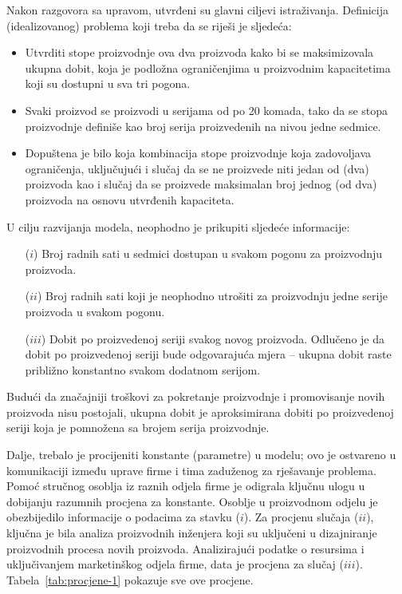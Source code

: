 \documentclass[a4paper, utf8, 11pt, colorlinks]{book}
\theoremstyle{definition}
\begin{document}
Nakon razgovora sa upravom, utvrđeni su glavni ciljevi istraživanja. Definicija  (idealizovanog) problema koji treba da se riješi je sljedeća:
\begin{itemize}
    \item Utvrditi  stope proizvodnje  ova dva proizvoda kako bi se maksimizovala ukupna dobit, koja je podložna ograničenjima u  proizvodnim kapacitetima koji su dostupni u sva tri pogona. 
    \item Svaki proizvod se proizvodi u serijama od po 20 komada, tako da se stopa proizvodnje definiše kao broj serija proizvedenih na nivou jedne sedmice. 
    \item Dopuštena je bilo koja kombinacija stope proizvodnje koja zadovoljava ograničenja, uključujući i slučaj da se ne proizvede niti jedan od (dva) proizvoda kao i slučaj da se proizvede maksimalan broj jednog (od dva) proizvoda na osnovu utvrđenih kapaciteta.
\end{itemize}

U cilju razvijanja modela, neophodno je prikupiti sljedeće informacije:
\begin{itemize}
		\item[($i$)]   Broj radnih sati u sedmici dostupan u svakom pogonu za proizvodnju proizvoda.  
	\item[($ii$)]   Broj radnih sati koji je neophodno utrošiti  za proizvodnju jedne serije proizvoda u svakom pogonu.	\item[($iii$)] Dobit po proizvedenoj seriji svakog novog proizvoda. Odlučeno je da dobit po proizvedenoj seriji bude   odgovarajuća mjera -- ukupna dobit  raste približno konstantno svakom dodatnom serijom. %
	
\end{itemize} 

Budući da značajniji troškovi za pokretanje proizvodnje i promovisanje novih proizvoda nisu postojali, ukupna dobit je aproksimirana dobiti po proizvedenoj seriji koja je pomnožena sa brojem serija proizvodnje.  


Dalje, trebalo je procijeniti konstante (parametre)  u modelu; ovo je ostvareno u komunikaciji između uprave firme i tima zaduženog za rješavanje problema. Pomoć stručnog osoblja iz raznih odjela firme je odigrala ključnu ulogu u dobijanju razumnih procjena za konstante. 
 Osoblje u proizvodnom odjelu   je obezbijedilo informacije o podacima za stavku ($i$). Za procjenu slučaja ($ii$), ključna je bila analiza proizvodnih inženjera koji su uključeni u dizajniranje proizvodnih procesa novih proizvoda. Analizirajući podatke o resursima i uključivanjem  marketinškog odjela firme,  data je procjena za slučaj ($iii$). Tabela~\ref{tab:procjene-1} pokazuje sve ove procjene. 
\end{document}
